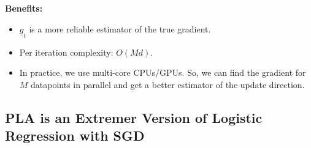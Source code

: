     \begin{intuition}
        \textbf{Benefits:}
        \begin{itemize}[left=0pt]
            \item \( \underline{g}_t \) is a more reliable estimator of the true gradient.
            \item Per iteration complexity: \( O(Md) \).
            \item In practice, we use multi-core CPUs/GPUs. So, we can find the gradient for \( M \) datapoints in parallel and get a better estimator of the update direction.
        \end{itemize}
    \end{intuition}

\subsection{PLA is an Extremer Version of Logistic Regression with SGD}

